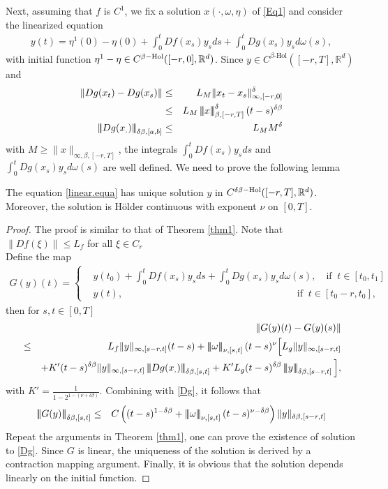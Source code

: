 \documentclass[graybox]{svmult}
\newcommand{\R}{\ensuremath{\mathbb{R}}}
\newcommand{\ltn}{\ensuremath{\left| \! \left| \! \left|}}
\newcommand{\rtn}{\ensuremath{\right| \! \right| \! \right|}}
\begin{document}
Next, assuming that $f$ is $C^1$, we fix a solution $x(\cdot,\omega,\eta)$ of \eqref{Eq1} and consider the linearized equation
\begin{eqnarray}\label{linear.equa}
y(t)=\eta^1(0)-\eta(0)+\int_0^t Df(x_s)y_sds+\int_0^tDg(x_s)y_sd\omega(s),
\end{eqnarray}
with initial function $\eta^1-\eta\in C^{\beta\rm{-Hol}}([-r,0],\R^d)$. Since $y\in C^{\beta\text{-Hol}}([-r,T],\R^d)$ and
\begin{eqnarray}\label{Dg}
\|Dg(x_t)-Dg(x_s)\|&\leq & L_M \|x_t-x_s\|^\delta_{\infty,[-r,0]}\notag\\
&\leq& L_M  \ltn x\rtn_{\beta,[-r,T]}^\delta (t-s)^{\delta\beta}\notag\\
\ltn Dg(x_.)\rtn_{\delta\beta,[a,b]} &\leq & L_MM^\delta
\end{eqnarray}
with $M\geq\| x\|_{\infty,\beta,[-r,T]}$, the integrals $\int_0^t Df(x_s)y_sds $ and $\int_0^tDg(x_s)y_sd\omega(s)$ are well defined. We need to prove the following lemma
\begin{lemma}
	The equation \eqref{linear.equa} has unique solution  $y$ in $C^{\delta\beta\rm{-Hol}}([-r,T],\R^d)$. Moreover, the solution is H\"older continuous with exponent $\nu$ on $[0,T]$.
\end{lemma}
\begin{proof}
	The proof is similar to that of Theorem \ref{thm1}. Note that $\|Df(\xi)\|\leq L_f$ for all $\xi\in C_r$ \\
	Define the map
	\begin{eqnarray*}
		G(y)(t)=
		\begin{cases}
			&  y(t_0)+ \int_0^t Df(x_s)y_sds+\int_0^tDg(x_s)y_sd\omega(s),\quad \text{if}\;\; t\in [t_0,t_1]\\
			& y(t), \qquad \qquad \qquad \qquad \qquad \qquad \qquad \qquad \quad\;\;\; \text{if}\;\; t\in [t_0-r,t_0],
		\end{cases}
	\end{eqnarray*}	
	then for $s,t\in [0,T]$
	\begin{eqnarray*}
		&&\|G(y)(t)-G(y)(s)\|\\
		&\leq & L_f \|y\|_{\infty,[s-r,t]}(t-s)+ \ltn\omega\rtn_{\nu,[s,t]}(t-s)^\nu \Big[L_g \|y\|_{\infty,[s-r,t]}\\
		&&+ K' (t-s)^{\delta\beta}\|y\|_{\infty,[s-r,t]}\ltn Dg(x_.)\rtn_{\delta\beta,[s,t]}+K'L_g (t-s)^{\delta\beta} \ltn y\rtn_{\delta\beta,[s-r,t]}\Big],
	\end{eqnarray*}
	with $K'=\frac{1}{1-2^{1-(\nu+\delta\beta)}}$. Combining with \eqref{Dg}, it follows that
	\begin{eqnarray*}
		\ltn G(y)\rtn_{\delta\beta,[s,t]}&\leq & C \left((t-s)^{1-\delta\beta} + \ltn\omega\rtn_{\nu,[s,t]}(t-s)^{\nu-\delta\beta} \right) \| y\|_{\delta\beta,[s-r,t]}
	\end{eqnarray*}
	Repeat the arguments in Theorem \ref{thm1}, one can prove the existence of solution to \eqref{Dg}. Since $G$ is linear, the uniqueness of the solution is derived by a contraction mapping argument. Finally, it is obvious that the solution depends linearly on the initial function.
\end{proof}
\end{document}
